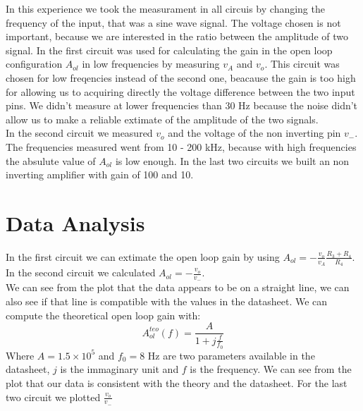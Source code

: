 In this experience we took the measurament in all circuis by changing the frequency of the input, that was a  sine wave signal. The voltage chosen is not important, because we are interested in the ratio between the amplitude of two signal.
In the first circuit was used for calculating the gain in the open loop configuration $A_{ol}$ in low frequencies by measuring $v_A$ and $v_{o}$. This circuit was chosen for low freqencies instead of the second one, beacause the gain is too high for allowing us to acquiring directly the voltage difference between the two input pins. 
We didn't measure at lower frequencies than 30 Hz because the noise didn't allow us to make a reliable extimate of the amplitude of the two signals.\\
In the second circuit we measured $v_{o}$ and the voltage of the non inverting pin $v_-$. The frequencies measured went from 10 - 200 kHz, because with high frequencies the absulute value of $A_{ol}$ is low enough.
In the last two circuits we built an non inverting amplifier with gain of 100 and 10.

\section{Data Analysis}

In the first circuit we can extimate the open loop gain by using $A_{ol} = - \frac{v_{o}}{v_A} \frac{R_3 + R_4}{R_4}$.
In the second circuit we calculated $A_{ol} = - \frac{v_{o}}{v_-}$. \\
We can see from the plot that the data appears to be on a straight line, we can also see if that line is compatible with the values in the datasheet. We can compute the theoretical open loop gain with: $$A_{ol}^{teo}(f) = \frac{A}{1 + j\frac{f}{f_0}}$$ Where $A = 1.5 \times 10^5$ and $f_0 = 8$ Hz are two parameters available in the datasheet, $j$ is the immaginary unit and $f$ is the frequency. We can see from the plot that our data is consistent with the theory and the datasheet.
For the last two circuit we plotted $\frac{v_{o}}{v_-}$